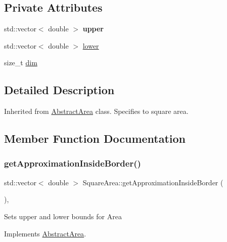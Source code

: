 \subsection*{Private Attributes}
\begin{DoxyCompactItemize}
\item 
\mbox{\label{class_square_area_a229fd5d084dde99c9d55e8053c482ddc}} 
std\+::vector$<$ double $>$ {\bfseries upper}
\item 
std\+::vector$<$ double $>$ \hyperlink{class_square_area_a9225f1cc2152524ea140390d605d65e0}{lower}
\item 
size\+\_\+t \hyperlink{class_square_area_ac758b2a9b3f3bd9eb0d3a0c528f23931}{dim}
\end{DoxyCompactItemize}


\subsection{Detailed Description}
Inherited from \hyperlink{class_abstract_area}{Abstract\+Area} class. Specifies to square area. 

\subsection{Member Function Documentation}
\mbox{\label{class_square_area_abd7441aaf62dcbf46a22e2d6a5ef34d4}} 
\subsubsection{\texorpdfstring{get\+Approximation\+Inside\+Border()}{getApproximationInsideBorder()}}
{\footnotesize\ttfamily std\+::vector$<$ double $>$ Square\+Area\+::get\+Approximation\+Inside\+Border (\begin{DoxyParamCaption}{ }\end{DoxyParamCaption})\hspace{0.3cm}{\ttfamily [override]}, {\ttfamily [virtual]}}

Sets upper and lower bounds for Area 

Implements \hyperlink{class_abstract_area_a832003b7c0e9e75d417c577b56a3013a}{Abstract\+Area}.

